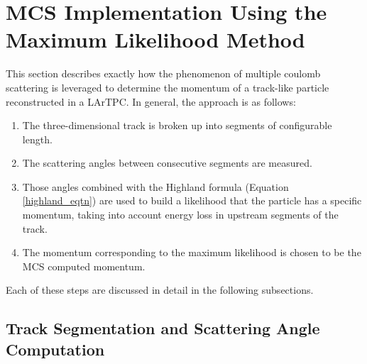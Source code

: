 \documentclass[a4paper,11pt]{article}
\begin{document}
\section{MCS Implementation Using the Maximum Likelihood Method}\label{MCS_technique_section}

This section describes exactly how the phenomenon of multiple coulomb scattering is leveraged to determine the momentum of a track-like particle reconstructed in a LArTPC. In general, the approach is as follows:
\begin{enumerate}
\item The three-dimensional track is broken up into segments of configurable length.
\item The scattering angles between consecutive segments are measured.
\item Those angles combined with the Highland formula (Equation \ref{highland_eqtn}) are used to build a likelihood that the particle has a specific momentum, taking into account energy loss in upstream segments of the track.
\item The momentum corresponding to the maximum likelihood is chosen to be the MCS computed momentum.
\end{enumerate}
Each of these steps are discussed in detail in the following subsections.\\


\subsection{Track Segmentation and Scattering Angle Computation}\label{track_segmentation_and_scattering_angle_computation_section}
\end{document}
